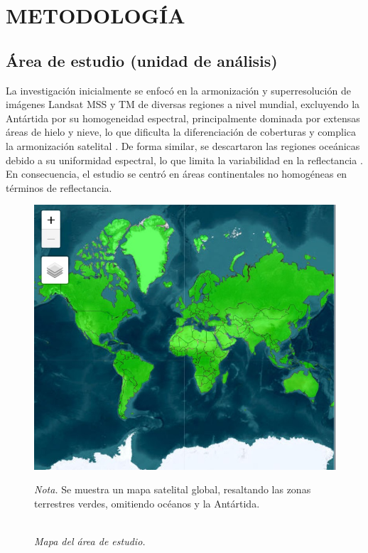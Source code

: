 \Chapter{}
\chapter{METODOLOGÍA}
    \section{Área de estudio (unidad de análisis)}
        La investigación inicialmente se enfocó en la armonización y superresolución de imágenes Landsat MSS y TM de diversas regiones a nivel mundial, excluyendo la Antártida por su homogeneidad espectral, principalmente dominada por extensas áreas de hielo y nieve, lo que dificulta la diferenciación de coberturas y complica la armonización satelital \autocite{kokhanovsky2019retrieval}. De forma similar, se descartaron las regiones oceánicas debido a su uniformidad espectral, lo que limita la variabilidad en la reflectancia \autocite{estrella2021spectral}. En consecuencia, el estudio se centró en áreas continentales no homogéneas en términos de reflectancia.
        \begin{figure}[H] 
            \caption{\doublespacing \\ \textit{Mapa del área de estudio.}} 
            \centering
            \includegraphics[width=1\linewidth]{E_IMAGENES/area_estudio.jpg}
            \begin{justify}
                \textit{Nota.} Se muestra un mapa satelital global, resaltando las zonas terrestres verdes, omitiendo océanos y la Antártida.
            \end{justify}                    
            \label{area_estudio}
        \end{figure}

